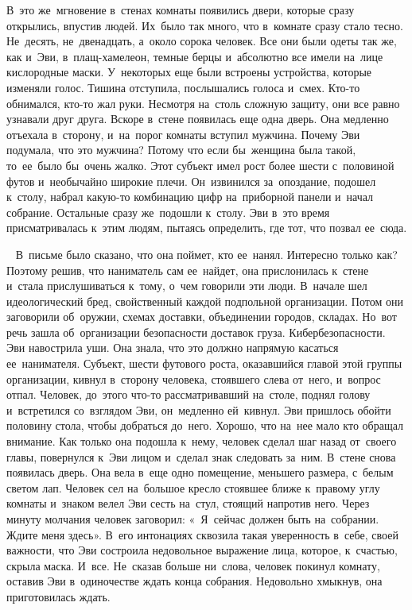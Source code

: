 В~это же~мгновение в~стенах комнаты появились двери, которые сразу открылись, впустив людей.
Их~было так много, что в~комнате сразу стало тесно.
Не~десять, не~двенадцать, а~около сорока человек.
Все они были одеты так же, как и~Эви, в~плащ-хамелеон, темные берцы и~абсолютно все имели на~лице кислородные маски.
У~некоторых еще были встроены устройства, которые изменяли голос.
Тишина отступила, послышались голоса и~смех.
Кто-то обнимался, кто-то жал руки.
Несмотря на~столь сложную защиту, они все равно узнавали друг друга.
Вскоре в~стене появилась еще одна дверь.
Она медленно отъехала в~сторону, и~на~порог комнаты вступил мужчина.
Почему Эви подумала, что это мужчина? Потому что если бы~женщина была такой, то~ее~было бы~очень жалко.
Этот субъект имел рост более шести с~половиной футов и~необычайно широкие плечи.
Он~извинился за~опоздание, подошел к~столу, набрал какую-то комбинацию цифр на~приборной панели и~начал собрание.
Остальные сразу же~подошли к~столу.
Эви в~это время присматривалась к~этим людям, пытаясь определить, где тот, что позвал ее~сюда.

~
В~письме было сказано, что она поймет, кто ее~нанял.
Интересно только как? Поэтому решив, что наниматель сам ее~найдет, она прислонилась к~стене и~стала прислушиваться к~тому, о~чем говорили эти люди.
В~начале шел идеологический бред, свойственный каждой подпольной организации.
Потом они заговорили об~оружии, схемах доставки, объединении городов, складах.
Но~вот речь зашла об~организации безопасности доставок груза.
Кибербезопасности.
Эви навострила уши.
Она знала, что это должно напрямую касаться ее~нанимателя.
Субъект, шести футового роста, оказавшийся главой этой группы организации, кивнул в~сторону человека, стоявшего слева от~него, и~вопрос отпал.
Человек, до~этого что-то рассматривавший на~столе, поднял голову и~встретился со~взглядом Эви, он~медленно ей~кивнул.
Эви пришлось обойти половину стола, чтобы добраться до~него.
Хорошо, что на~нее мало кто обращал внимание.
Как только она подошла к~нему, человек сделал шаг назад от~своего главы, повернулся к~Эви лицом и~сделал знак следовать за~ним.
В~стене снова появилась дверь.
Она вела в~еще одно помещение, меньшего размера, с~белым светом лап.
Человек сел на~большое кресло стоявшее ближе к~правому углу комнаты и~знаком велел Эви сесть на~стул, стоящий напротив него.
Через минуту молчания человек заговорил: «~Я~сейчас должен быть на~собрании.
Ждите меня здесь».
В~его интонациях сквозила такая уверенность в~себе, своей важности, что Эви состроила недовольное выражение лица, которое, к~счастью, скрыла маска.
И~все.
Не~сказав больше ни~слова, человек покинул комнату, оставив Эви в~одиночестве ждать конца собрания.
Недовольно хмыкнув, она приготовилась ждать.
 
